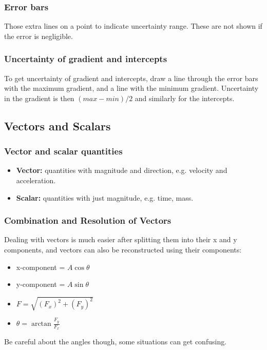 \subsubsection{Error bars}
Those extra lines on a point to indicate uncertainty range. These are not shown
if the error is negligible.

\subsubsection{Uncertainty of gradient and intercepts}
To get uncertainty of gradient and intercepts, draw a line through the error
bars with the maximum gradient, and a line with the minimum gradient.
Uncertainty in the gradient is then $(max - min) / 2$ and similarly for the
intercepts.

\subsection{Vectors and Scalars}

\subsubsection{Vector and scalar quantities}
\begin{itemize}
    \item \textbf{Vector:} quantities with magnitude and direction, e.g.
        velocity and acceleration.
    \item \textbf{Scalar:} quantities with just magnitude, e.g. time, mass.
\end{itemize}

\subsubsection{Combination and Resolution of Vectors}
Dealing with vectors is much easier after splitting them into their x and y
components, and vectors can also be reconstructed using their components:
\begin{itemize}
    \item x-component = $A\cos\theta$
    \item y-component = $A\sin\theta$
    \item $F = \sqrt{(F_x)^2 + (F_y)^2}$
    \item $\theta = \arctan\frac{F_y}{F_x}$
\end{itemize}
Be careful about the angles though, some situations can get confusing.

